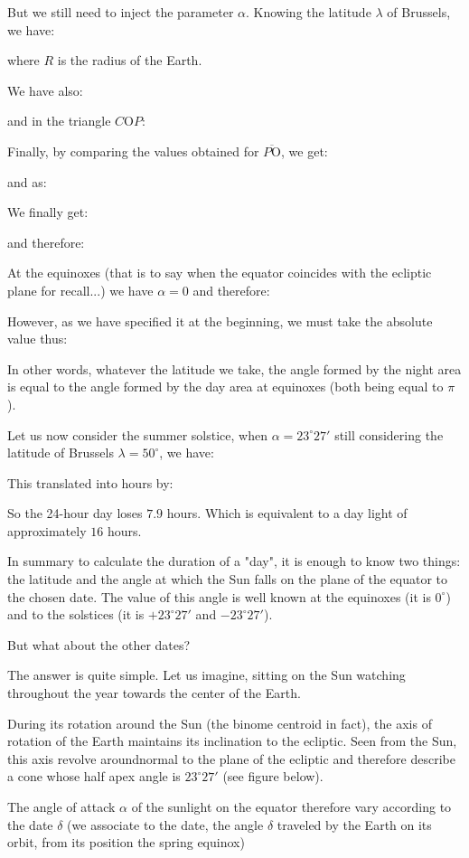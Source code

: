	But we still need to inject the parameter $\alpha$. Knowing the latitude $\lambda$ of Brussels, we have:
	
	where $R$ is the radius of the Earth.

	We have also:
	
	and in the triangle $C\text{O}P$:
	
	Finally, by comparing the values obtained for $\overline{P\text{O}}$, we get:
	
	and as:
	
	We finally get:
	
	and therefore:
	
	At the equinoxes (that is to say when the equator coincides with the ecliptic plane for recall...) we have $\alpha=0$ and therefore:
	
	However, as we have specified it at the beginning, we must take the absolute value thus:
	
	In other words, whatever the latitude we take, the angle formed by the night area is equal to the angle formed by the day area at equinoxes (both being equal to $\pi$).

	Let us now consider the summer solstice, when $\alpha=23^\circ 27'$ still considering the latitude of Brussels $\lambda=50^\circ$, we have:
	
	This translated into hours by:
	
	So the 24-hour day loses $7.9$ hours. Which is equivalent to a day light of approximately $16$ hours.
	
	In summary to calculate the duration of a "day", it is enough to know two things: the latitude and the angle at which the Sun falls on the plane of the equator to the chosen date. The value of this angle is well known at the equinoxes (it is $0^\circ$) and to the solstices (it is $+23^\circ 27'$ and $-23^\circ 27'$).

	But what about the other dates?
	
	The answer is quite simple. Let us imagine, sitting on the Sun watching throughout the year towards the center of the Earth.

	During its rotation around the Sun (the binome centroid in fact), the axis of rotation of the Earth maintains its inclination to the ecliptic. Seen from the Sun, this axis revolve aroundnormal to the plane of the ecliptic and therefore describe a cone whose half apex angle is $23^\circ27'$ (see figure below).

	The angle of attack $\alpha$ of the sunlight on the equator therefore vary according to the date $\delta$ (we associate to the date, the angle $\delta$ traveled by the Earth on its orbit, from its position the spring equinox)

